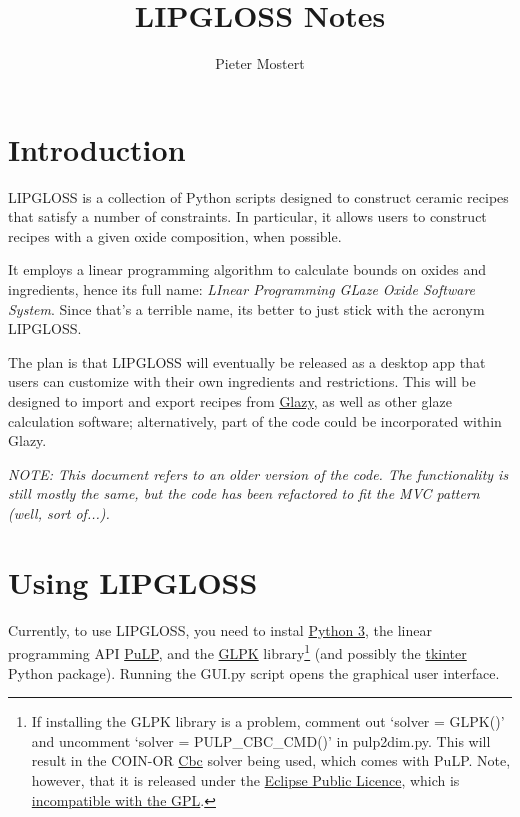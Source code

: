 \documentclass[a4paper,10pt]{article}
\title{LIPGLOSS Notes}
\author{Pieter Mostert}%
\def\'{\textquotesingle}
\begin{document}
\maketitle
\def\thefootnote{\fnsymbol{footnote}}\setcounter{footnote}{1}
\section{Introduction}
LIPGLOSS is a collection of Python scripts designed to construct ceramic recipes that satisfy a number of constraints. In particular, it allows users to construct recipes with a given oxide composition, when possible.

It employs a linear programming algorithm to calculate bounds on oxides and ingredients, hence its full name: \textit{LInear Programming GLaze Oxide Software System}. Since that's a terrible name, it\'s better to just stick with the acronym LIPGLOSS.

The plan is that LIPGLOSS will eventually be released as a desktop app that users can customize with their own ingredients and restrictions. This will be designed to import and export recipes from \href{https://glazy.org}{Glazy}, as well as other glaze calculation software; alternatively, part of the code could be incorporated within Glazy.

\textit{NOTE: This document refers to an older version of the code. The functionality is still mostly the same, but the code has been refactored to fit the MVC pattern (well, sort of...).}

\section{Using LIPGLOSS}

Currently, to use LIPGLOSS, you need to instal \href{https://www.python.org/downloads/}{Python 3}, the linear programming API \href{https://github.com/coin-or/pulp}{PuLP}, and the \href{https://www.gnu.org/software/glpk/}{GLPK} library\footnote{If installing the GLPK library is a problem, comment out `solver = GLPK()' and uncomment `solver = PULP\_CBC\_CMD()' in pulp2dim.py. This will result in the COIN-OR \href{https://projects.coin-or.org/Cbc}{Cbc} solver being used, which comes with PuLP. Note, however, that it is released under the \href{https://en.wikipedia.org/wiki/Eclipse_Public_License}{Eclipse Public Licence}, which is \href{https://eclipse.org/legal/eplfaq.php}{incompatible with the GPL}.} (and possibly the \href{https://wiki.python.org/moin/TkInter}{tkinter} Python package). Running the GUI.py script opens the graphical user interface. 
\end{document}
